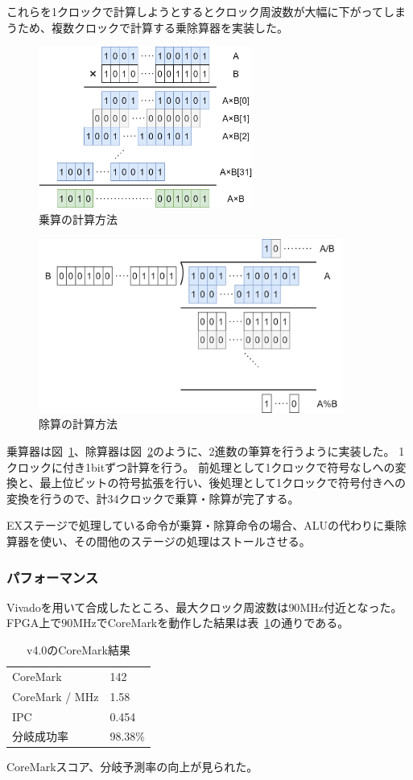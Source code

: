 \documentclass[dvipdfmx,10pt,a4paper,titlepage]{jsarticle}
\begin{document}
    これらを1クロックで計算しようとするとクロック周波数が大幅に下がってしまうため、複数クロックで計算する乗除算器を実装した。
    \begin{figure}[h]
        \centering
        \includegraphics[width=7cm]{figure/mul.png}
        \caption{乗算の計算方法}\label{fig:multiplier}
    \end{figure}
    \begin{figure}[h]
        \centering
        \includegraphics[width=10cm]{figure/divrem.png}
        \caption{除算の計算方法}\label{fig:divrem}
    \end{figure}
    乗算器は図~\ref{fig:multiplier}、除算器は図~\ref{fig:divrem}のように、2進数の筆算を行うように実装した。
    1クロックに付き1bitずつ計算を行う。
    前処理として1クロックで符号なしへの変換と、最上位ビットの符号拡張を行い、後処理として1クロックで符号付きへの変換を行うので、計34クロックで乗算・除算が完了する。

    EXステージで処理している命令が乗算・除算命令の場合、ALUの代わりに乗除算器を使い、その間他のステージの処理はストールさせる。
    \subsubsection{パフォーマンス}
    Vivadoを用いて合成したところ、最大クロック周波数は$90\mathrm{MHz}$付近となった。
    FPGA上で$90\mathrm{MHz}$でCoreMarkを動作した結果は表~\ref{tab:v4.0}の通りである。
    \begin{table}[h]
        \begin{center}
            \caption{v4.0のCoreMark結果}\label{tab:v4.0}
            \begin{tabular}{ll}
                CoreMark & 142\\
                CoreMark / MHz & 1.58 \\
                IPC & 0.454 \\
                分岐成功率 & 98.38\% \\
            \end{tabular}
        \end{center}
    \end{table}
    CoreMarkスコア、分岐予測率の向上が見られた。
\end{document}
